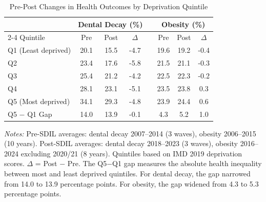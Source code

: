 \begin{table}[t]
\centering
\caption{Pre-Post Changes in Health Outcomes by Deprivation Quintile}
\label{tab:quintile}
\begin{tabular}{lccccccc}
\toprule
 & \multicolumn{3}{c}{Dental Decay (\%)} & & \multicolumn{3}{c}{Obesity (\%)} \\
\cmidrule{2-4} \cmidrule{6-8}
Quintile & Pre & Post & $\Delta$ & & Pre & Post & $\Delta$ \\
\midrule
Q1 (Least deprived) & 20.1 & 15.5 & -4.7 & & 19.6 & 19.2 & -0.4 \\
Q2 & 23.4 & 17.6 & -5.8 & & 21.5 & 21.1 & -0.3 \\
Q3 & 25.4 & 21.2 & -4.2 & & 22.5 & 22.3 & -0.2 \\
Q4 & 28.1 & 23.1 & -5.1 & & 23.5 & 23.8 & 0.3 \\
Q5 (Most deprived) & 34.1 & 29.3 & -4.8 & & 23.9 & 24.4 & 0.6 \\
\midrule
Q5 $-$ Q1 Gap & 14.0 & 13.9 & -0.1 & & 4.3 & 5.2 & 1.0 \\
\bottomrule
\end{tabular}
\par\vspace{0.3em}
{\footnotesize \textit{Notes:} Pre-SDIL averages: dental decay 2007--2014 (3 waves), obesity 2006--2015 (10 years). Post-SDIL averages: dental decay 2018--2023 (3 waves), obesity 2016--2024 excluding 2020/21 (8 years). Quintiles based on IMD 2019 deprivation scores. $\Delta$ = Post $-$ Pre. The Q5$-$Q1 gap measures the absolute health inequality between most and least deprived quintiles. For dental decay, the gap narrowed from 14.0 to 13.9 percentage points. For obesity, the gap widened from 4.3 to 5.3 percentage points.}
\end{table}
